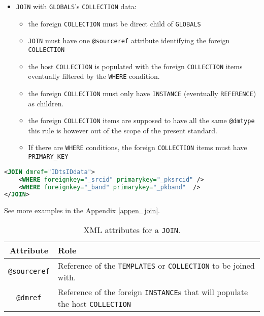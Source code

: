 \begin{itemize}
   \item \texttt{JOIN}  with \texttt{GLOBALS}'s \texttt{COLLECTION} data:
       \begin{itemize}
         \item the foreign \texttt{COLLECTION} must be direct child of \texttt{GLOBALS} 
         \item \texttt{JOIN} must have one \texttt{@sourceref} attribute identifying the foreign \texttt{COLLECTION} 
         \item the host \texttt{COLLECTION} is populated with the foreign \texttt{COLLECTION} items eventually filtered by the \texttt{WHERE} condition.
         \item the foreign \texttt{COLLECTION} must only have \texttt{INSTANCE}  (eventually \texttt{REFERENCE}) as children.
         \item the foreign \texttt{COLLECTION} items are supposed to have all the same \texttt{@dmtype}  this rule is however out of the scope of the present standard.
         \item If there are \texttt{WHERE} conditions, the foreign \texttt{COLLECTION} items must have \texttt{PRIMARY\_KEY} 
  \end{itemize}
\end{itemize}

\begin{lstlisting}[label={lst:join},caption={\texttt{JOIN example with 2 join conditions 
(see line~\ref{JOIN_snippet} in Appendix~\ref{appendix_A}).} 
The joined condition is satisfied when the value of the column \texttt{\_srcid} of the collection identified 
by \texttt{IDtsIDdata} matches this of the \texttt{\_band} column and the value of the column \texttt{\_pkband}
 matches this of the \texttt{\_pksrcid} column.
},language=XML]
<JOIN dmref="IDtsIDdata">
    <WHERE foreignkey="_srcid" primarykey="_pksrcid" />
    <WHERE foreignkey="_band" primarykey="_pkband"  />
</JOIN>
\end{lstlisting}

See more examples in the Appendix \ref{appen_join}. 
\begin{table}[!htbp]
\small
\centering
\begin{tabulary}{\linewidth}{|c|J|}       
       \hline 
            \textbf{Attribute} & 
            \textbf {Role}\\
       \hline         \hline  
             \texttt{@sourceref} & 
            Reference of the \texttt{TEMPLATES} or \texttt{COLLECTION} to be joined with. \\
        \hline 
            \texttt{@dmref} & 
            Reference of the foreign \texttt{INSTANCE}s that will populate the host \texttt{COLLECTION}  \\
        \hline 
     \end{tabulary}
     \caption{XML attributes for a \texttt{JOIN}.} 
     \label{tbl:join-att}
 \end{table}

